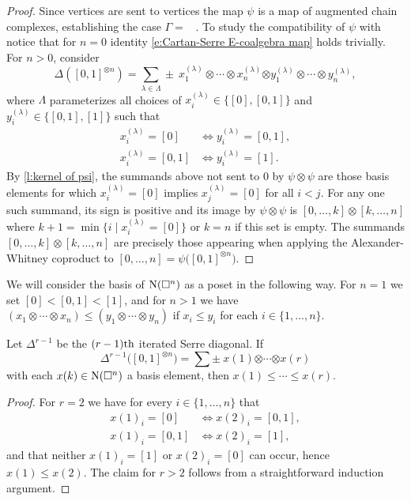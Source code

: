\begin{proof}
	Since vertices are sent to vertices the map $\psi$ is a map of augmented chain complexes, establishing the case $\Gamma =$ \counit \ .
	To study the compatibility of $\psi$ with \coproduct \, notice that for $n=0$ identity \eqref{e:Cartan-Serre E-coalgebra map} holds trivially.
	For $n > 0$, consider
	\begin{equation*}
	\Delta([0,1]^{\otimes n}) = \sum_{\lambda \in \Lambda} \pm \ x_1^{(\lambda)} \otimes \cdots \otimes x_n^{(\lambda)} \bm{\otimes} y_1^{(\lambda)} \otimes \cdots \otimes y_n^{(\lambda)},
	\end{equation*}
	where $\Lambda$ parameterizes all choices of $x_i^{(\lambda)} \in \{[0], [0,1]\}$ and $y_i^{(\lambda)} \in \{[0,1], [1]\}$ such that
	\begin{align*}
	x_i^{(\lambda)} = [0]   & \iff y_i^{(\lambda)} = [0,1], \\
	x_i^{(\lambda)} = [0,1] & \iff y_i^{(\lambda)} = [1].
	\end{align*}
	By \cref{l:kernel of psi}, the summands above not sent to $0$ by $\psi \otimes \psi$ are those basis elements for which $x_i^{(\lambda)} = [0]$ implies $x_j^{(\lambda)} = [0]$ for all $i < j$.
	For any one such summand, its sign is positive and its image by $\psi \otimes \psi$ is $[0, \dots, k] \otimes [k, \dots, n]$ where $k+1 = \min \{i \mid x_i^{(\lambda)} = [0]\}$ or $k = n$ if this set is empty.
	The summands $[0, \dots, k] \otimes [k, \dots, n]$ are precisely those appearing when applying the Alexander-Whitney coproduct to $[0, \dots, n] = \psi \big( [0,1]^{\otimes n} \big)$.
\end{proof}

We will consider the basis of $\operatorname{N}(\square^n)$ as a poset in the following way.
For $n = 1$ we set $[0] < [0,1] < [1]$, and for $n > 1$ we have $(x_1 \otimes \cdots \otimes x_n) \leq (y_1 \otimes \cdots \otimes y_n)$ if $x_i \leq y_i$ for each $i \in \{1, \dots, n\}$. 

\begin{lemma}
	Let $\Delta^{r-1}$ be the $(r-1)\mathrm{th}$ iterated Serre diagonal.
	If
	\begin{equation*}	
	\Delta^{r-1} \big([0,1]^{\otimes n}\big) =
	\sum \pm \ x{(1)} \bm{\otimes} \cdots \bm{\otimes} x{(r)}
	\end{equation*}
	with each $x(k) \in \operatorname{N}(\square^n)$ a basis element, then $x{(1)} \leq \cdots \leq x{(r)}$.
\end{lemma}

\begin{proof}
	For $r = 2$ we have for every $i \in \{1, \dots, n\}$ that
	\begin{align*}
	x(1)_i = [0]   & \iff x(2)_i = [0,1], \\
	x(1)_i = [0,1] & \iff x(2)_i = [1],
	\end{align*}
	and that neither $x(1)_i = [1]$ or $x(2)_i = [0]$ can occur, hence $x(1) \leq x(2)$.
	The claim for $r > 2$ follows from a straightforward induction argument.
\end{proof}

